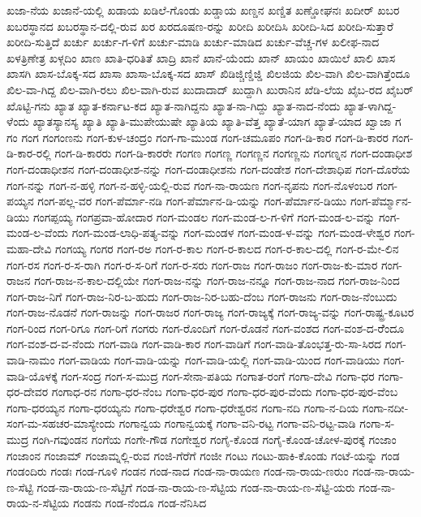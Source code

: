 ಖಜಾ-ನೆಯ
ಖಜಾನೆ-ಯಲ್ಲಿ
ಖಡಾಯ
ಖಡಿಲೆ-ಗೊಂಡು
ಖಡ್ಡಾಯ
ಖಣ್ಡನ
ಖಣ್ಡಿತ
ಖಣ್ಡೋಘನಃ
ಖದೀರ್
ಖಬರ
ಖಬರಸ್ಥಾನದ
ಖಬರಸ್ಥಾನ-ದಲ್ಲಿ-ರುವ
ಖರ
ಖರದೂಷಣ-ರನ್ನು
ಖರೀದಿ
ಖರೀದಿಸಿ
ಖರೀದಿ-ಸಿದ
ಖರೀದಿ-ಸುತ್ತಾರೆ
ಖರೀದಿ-ಸುತ್ತಿದೆ
ಖರ್ಚು
ಖರ್ಚು-ಗ-ಳಿಗೆ
ಖರ್ಚು-ಮಾಡಿ
ಖರ್ಚು-ಮಾಡಿದ
ಖರ್ಚು-ವೆಚ್ಚ-ಗಳ
ಖಲೀಫ-ನಾದ
ಖಳತ್ರಿಣೇತ್ರ
ಖಳ್ಗದಿಂ
ಖಾಣ
ಖಾತಿ-ಧರಿತಿತೆ
ಖಾದ್ರಿ
ಖಾನೆ
ಖಾನೆ-ಯೆಂದು
ಖಾನ್
ಖಾಯಂ
ಖಾಯಿಲೆ
ಖಾಲಿ
ಖಾಸ
ಖಾಸಗಿ
ಖಾಸ-ಬೊಕ್ಕ-ಸದ
ಖಾಸಾ
ಖಾಸಾ-ಬೊಕ್ಕ-ಸದ
ಖಾಸ್
ಖಿಡಿಜ್ಚಿಣ್ಡಿಜ್ಡಿ
ಖಿಲಜಿಯ
ಖಿಲ-ವಾಗಿ
ಖಿಲ-ವಾಗಿತ್ತೆಂದೂ
ಖಿಲ-ವಾ-ಗಿದ್ದ
ಖಿಲ-ವಾಗಿ-ರಲು
ಖಿಲ-ವಾಗಿ-ರುವ
ಖುದಾದಾದ್
ಖುದ್ದಾಗಿ
ಖುರಾನಿನ
ಖೆಡಿ-ಲೆಯ
ಖೈಬ-ರದ
ಖೈಬರ್
ಖೊಟ್ಟಿ-ಗನು
ಖ್ಯಾತ
ಖ್ಯಾತ-ಕರ್ನಾಟ-ಕದ
ಖ್ಯಾತ-ನಾಗಿದ್ದನು
ಖ್ಯಾತ-ನಾ-ಗಿದ್ದು
ಖ್ಯಾತ-ನಾದ-ನೆಂದು
ಖ್ಯಾತ-ಳಾಗಿದ್ದ-ಳೆಂದು
ಖ್ಯಾತಸ್ಯಾನಸ್ಯ
ಖ್ಯಾತಿ
ಖ್ಯಾತಿ-ಮುಪೇಯುಷೇ
ಖ್ಯಾತಿಯ
ಖ್ಯಾತಿ-ವೆತ್ತ
ಖ್ಯಾತೆ-ಯಾಗ
ಖ್ಯಾತೆ-ಯಾದ
ಖ್ವಾಜಾ
ಗ
ಗಂ
ಗಂಗ
ಗಂಗಂಣನು
ಗಂಗ-ಕುಳ-ಚಂದ್ರಂ
ಗಂಗ-ಗಾ-ಮುಂಡ
ಗಂಗ-ಚಮೂಪಂ
ಗಂಗ-ಡಿ-ಕಾರ
ಗಂಗ-ಡಿ-ಕಾರರ
ಗಂಗ-ಡಿ-ಕಾರ-ರಲ್ಲಿ
ಗಂಗ-ಡಿ-ಕಾರರು
ಗಂಗ-ಡಿ-ಕಾರರೇ
ಗಂಗಣ
ಗಂಗಣ್ಣ
ಗಂಗಣ್ಣನ
ಗಂಗಣ್ಣನು
ಗಂಗಣ್ನನ
ಗಂಗ-ದಂಡಾಧೀಶ
ಗಂಗ-ದಂಡಾಧೀಶನ
ಗಂಗ-ದಂಡಾಧೀಶ-ನನ್ನು
ಗಂಗ-ದಂಡಾಧೀಶನು
ಗಂಗ-ದಂಡೇಶ
ಗಂಗ-ದೇಶಾಧಿಪ
ಗಂಗ-ದೊರೆಯ
ಗಂಗ-ನನ್ನು
ಗಂಗ-ನ-ಹಳ್ಳಿ
ಗಂಗ-ನ-ಹಳ್ಳಿ-ಯಲ್ಲಿ-ರುವ
ಗಂಗ-ನಾ-ರಾಯಣ
ಗಂಗ-ನೃಪನು
ಗಂಗ-ನೊಳಂಬರ
ಗಂಗ-ಪಯ್ಯನ
ಗಂಗ-ಪಲ್ಲ-ವರ
ಗಂಗ-ಪೆರ್ಮಾ-ನಡಿ
ಗಂಗ-ಪೆರ್ಮಾನ-ಡಿ-ಯನ್ನು
ಗಂಗ-ಪೆರ್ಮಾನ-ಡಿಯು
ಗಂಗ-ಪೆರ್ಮ್ಮಾನ-ಡಿಯು
ಗಂಗಪ್ಪಯ್ಯ
ಗಂಗಪ್ರವಾ-ಹೋದಾರ
ಗಂಗ-ಮಂಡಲ
ಗಂಗ-ಮಂಡ-ಲ-ಗ-ಳಿಗೆ
ಗಂಗ-ಮಂಡ-ಲ-ವನ್ನು
ಗಂಗ-ಮಂಡ-ಲ-ವೆಂದು
ಗಂಗ-ಮಂಡ-ಲಾಧಿ-ಪತ್ಯ-ವನ್ನು
ಗಂಗ-ಮಂಡಳ
ಗಂಗ-ಮಂಡ-ಳ-ವನ್ನು
ಗಂಗ-ಮಂಡ-ಳೇಶ್ವರ
ಗಂಗ-ಮಹಾ-ದೇವಿ
ಗಂಗಯ್ಯ
ಗಂಗರ
ಗಂಗ-ರಅ
ಗಂಗ-ರ-ಕಾಲ
ಗಂಗ-ರ-ಕಾಲದ
ಗಂಗ-ರ-ಕಾಲ-ದಲ್ಲಿ
ಗಂಗ-ರ-ಮೇ-ಲಿನ
ಗಂಗ-ರಸ
ಗಂಗ-ರ-ಸ-ರಾಗಿ
ಗಂಗ-ರ-ಸ-ರಿಗೆ
ಗಂಗ-ರ-ಸರು
ಗಂಗ-ರಾಜ
ಗಂಗ-ರಾಜಂ
ಗಂಗ-ರಾಜ-ಕು-ಮಾರ
ಗಂಗ-ರಾಜನ
ಗಂಗ-ರಾಜ-ನ-ಕಾಲ-ದಲ್ಲಿಯೇ
ಗಂಗ-ರಾಜ-ನನ್ನು
ಗಂಗ-ರಾಜ-ನನ್ನೂ
ಗಂಗ-ರಾಜ-ನಾದ
ಗಂಗ-ರಾಜ-ನಿಂದ
ಗಂಗ-ರಾಜ-ನಿಗೆ
ಗಂಗ-ರಾಜ-ನಿರ-ಬ-ಹುದು
ಗಂಗ-ರಾಜ-ನಿರ-ಬಹು-ದೆಂಬ
ಗಂಗ-ರಾಜನು
ಗಂಗ-ರಾಜ-ನೆಂಬುದು
ಗಂಗ-ರಾಜ-ನೊಡನೆ
ಗಂಗ-ರಾಜನ್ನು
ಗಂಗ-ರಾಜರ
ಗಂಗ-ರಾಜ್ಯ
ಗಂಗ-ರಾಜ್ಯಕ್ಕೆ
ಗಂಗ-ರಾಜ್ಯ-ವನ್ನು
ಗಂಗ-ರಾಷ್ಟ್ರ-ಕೂಟರ
ಗಂಗ-ರಿಂದ
ಗಂಗ-ರಿಗೂ
ಗಂಗ-ರಿಗೆ
ಗಂಗರು
ಗಂಗ-ರೊಂದಿಗೆ
ಗಂಗ-ರೊಡನೆ
ಗಂಗ-ವಂಶದ
ಗಂಗ-ವಂಶ-ದ-ರೆೆಂದೂ
ಗಂಗ-ವಂಶ-ದ-ವ-ನೆಂದು
ಗಂಗ-ವಾಡಿ
ಗಂಗ-ವಾಡಿ-ಕಾರ
ಗಂಗ-ವಾಡಿಗೆ
ಗಂಗ-ವಾಡಿ-ತೊಂಭತ್ತ-ರು-ಸಾ-ಸಿರದ
ಗಂಗ-ವಾಡಿ-ನಾಮಂ
ಗಂಗ-ವಾಡಿಯ
ಗಂಗ-ವಾಡಿ-ಯನ್ನು
ಗಂಗ-ವಾಡಿ-ಯಲ್ಲಿ
ಗಂಗ-ವಾಡಿ-ಯಿಂದ
ಗಂಗ-ವಾಡಿಯು
ಗಂಗ-ವಾಡಿ-ಯೊಳಕ್ಕೆ
ಗಂಗ-ಸಂದ್ರ
ಗಂಗ-ಸ-ಮುದ್ರ
ಗಂಗ-ಸೇನಾ-ಪತಿಯ
ಗಂಗಾತ-ರಂಗೆ
ಗಂಗಾ-ದೇವಿ
ಗಂಗಾ-ಧರ
ಗಂಗಾ-ಧರ-ದೇವರ
ಗಂಗಾಧ-ರನ
ಗಂಗಾ-ಧರ-ನೆಂಬ
ಗಂಗಾ-ಧರ-ಪುರ
ಗಂಗಾ-ಧರ-ಪುರ-ವೆಂದು
ಗಂಗಾ-ಧರ-ಪುರ-ವೆಂಬ
ಗಂಗಾ-ಧರಯ್ಯನ
ಗಂಗಾ-ಧರಯ್ಯನು
ಗಂಗಾ-ಧರೇಶ್ವರ
ಗಂಗಾ-ಧರೇಶ್ವರನ
ಗಂಗಾ-ನದಿ
ಗಂಗಾ-ನ-ದಿಯ
ಗಂಗಾ-ನದೀ-ಸಂಗ-ಮ-ಸಹಚರ-ಮಾಸ್ಯೇಂದು
ಗಂಗಾನ್ವಯ
ಗಂಗಾನ್ವಯಕ್ಕೆ
ಗಂಗಾ-ವನಿ-ರಟ್ಟ
ಗಂಗಾ-ವನಿ-ರಟ್ಟ-ವಾಡಿ
ಗಂಗಾ-ಸ-ಮುದ್ರ
ಗಂಗಿ-ಗವುಂಡನ
ಗಂಗೆಯ
ಗಂಗೇ-ಗೌಡ
ಗಂಗೇಶ್ವರ
ಗಂಗೈ-ಕೊಂಡ
ಗಂಗೈ-ಕೊಂಡ-ಚೋಳ-ಪುರಕ್ಕೆ
ಗಂಜಾಂ
ಗಂಜಾಂನ
ಗಂಜಾಮ್
ಗಂಜಾಮ್ನಲ್ಲಿ-ರುವ
ಗಂಜಿ-ಗೆರೆಗೆ
ಗಂಜೀ
ಗಂಟು
ಗಂಟು-ಹಾಕಿ-ಕೊಂಡು
ಗಂಟೆ-ಯನ್ನು
ಗಂಡ
ಗಂಡಂದಿರು
ಗಂಡಃ
ಗಂಡ-ಗೂಳಿ
ಗಂಡನ
ಗಂಡ-ನಾದ
ಗಂಡ-ನಾ-ರಾಯಣ
ಗಂಡ-ನಾ-ರಾಯ-ಣರುಂ
ಗಂಡ-ನಾ-ರಾಯ-ಣ-ಸೆಟ್ಟಿ
ಗಂಡ-ನಾ-ರಾಯ-ಣ-ಸೆಟ್ಟಿಗೆ
ಗಂಡ-ನಾ-ರಾಯ-ಣ-ಸೆಟ್ಟಿಯ
ಗಂಡ-ನಾ-ರಾಯ-ಣ-ಸೆಟ್ಟಿ-ಯರು
ಗಂಡ-ನಾ-ರಾಯ-ನ-ಸೆಟ್ಟಿಯ
ಗಂಡನು
ಗಂಡ-ನೆಂದೂ
ಗಂಡ-ನೆನಿಸಿದ
